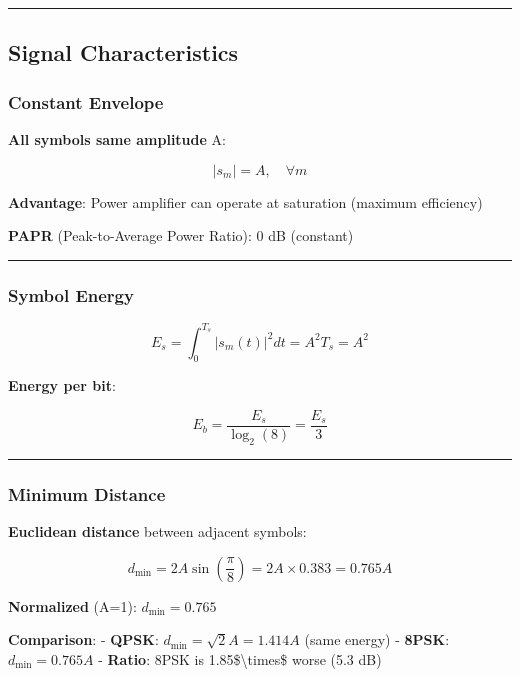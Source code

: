 \begin{center}\rule{0.5\linewidth}{0.5pt}\end{center}

\subsection{Signal Characteristics}\label{signal-characteristics}

\subsubsection{Constant Envelope}\label{constant-envelope}

\textbf{All symbols same amplitude} A:

\[
|s_m| = A, \quad \forall m
\]

\textbf{Advantage}: Power amplifier can operate at saturation (maximum
efficiency)

\textbf{PAPR} (Peak-to-Average Power Ratio): 0 dB (constant)

\begin{center}\rule{0.5\linewidth}{0.5pt}\end{center}

\subsubsection{Symbol Energy}\label{symbol-energy}

\[
E_s = \int_0^{T_s} |s_m(t)|^2 dt = A^2 T_s = A^2
\]

\textbf{Energy per bit}:

\[
E_b = \frac{E_s}{\log_2(8)} = \frac{E_s}{3}
\]

\begin{center}\rule{0.5\linewidth}{0.5pt}\end{center}

\subsubsection{Minimum Distance}\label{minimum-distance}

\textbf{Euclidean distance} between adjacent symbols:

\[
d_{\min} = 2A\sin\left(\frac{\pi}{8}\right) = 2A \times 0.383 = 0.765A
\]

\textbf{Normalized} (A=1): \(d_{\min} = 0.765\)

\textbf{Comparison}: - \textbf{QPSK}: \(d_{\min} = \sqrt{2}A = 1.414A\)
(same energy) - \textbf{8PSK}: \(d_{\min} = 0.765A\) - \textbf{Ratio}:
8PSK is 1.85\$\textbackslash times\$ worse (5.3 dB)


